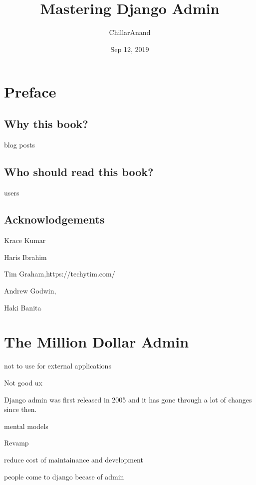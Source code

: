 \documentclass[letterpaper,12pt,english]{sphinxmanual}
\title{Mastering Django Admin}
\date{Sep 12, 2019}
\author{ChillarAnand}
\begin{document}
\pagestyle{empty}
\sphinxmaketitle
\pagestyle{plain}
\sphinxtableofcontents
\pagestyle{normal}
\label{\detokenize{index::doc}}



\chapter{Preface}
\label{\detokenize{preface:preface}}\label{\detokenize{preface::doc}}

\section{Why this book?}
\label{\detokenize{preface:why-this-book}}
blog posts


\section{Who should read this book?}
\label{\detokenize{preface:who-should-read-this-book}}
users


\section{Acknowlodgements}
\label{\detokenize{preface:acknowlodgements}}
Krace Kumar

Haris Ibrahim

Tim Graham,https://techytim.com/

Andrew Godwin, 

Haki Banita



\chapter{The Million Dollar Admin}
\label{\detokenize{admin_million_dollars:the-million-dollar-admin}}\label{\detokenize{admin_million_dollars::doc}}
not to use for external applications

Not good ux

Django admin was first released in 2005 and it has gone through a lot of changes since then.

mental models

Revamp

reduce cost of maintainance and development

people come to django becase of admin

\end{document}
